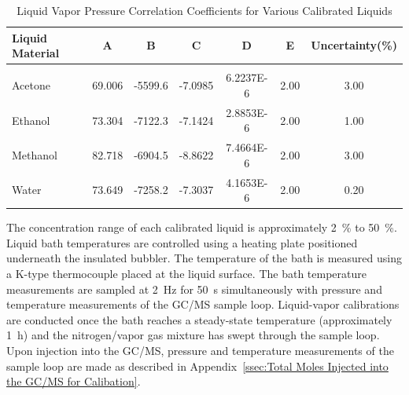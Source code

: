 \documentclass[12pt]{article}
\begin{document}
\begin{table}[!]
\caption{Liquid Vapor Pressure Correlation Coefficients for Various Calibrated Liquids}
\label{tab:Liquid Calibrate_Table}
\centering
	\footnotesize
	\begin{tabular}{lcccccc}
			\hline
\textbf{Liquid Material} &\textbf{A}& \textbf{B}& \textbf{C}&\textbf{D}&\textbf{E}&\textbf{Uncertainty(\%)}\\
\hline
\\[0.001cm]
Acetone	&	69.006	&	-5599.6	&	-7.0985	&	6.2237E-6	& 	2.00	&  3.00\\
Ethanol	&	73.304	&	-7122.3	&	-7.1424	&	2.8853E-6	& 	2.00	&  1.00\\
Methanol	&	82.718	&	-6904.5	&	-8.8622	&	7.4664E-6	& 	2.00	&  3.00\\
Water		&	73.649	&	-7258.2	&	-7.3037	&	4.1653E-6	& 	2.00	&  0.20\\
\hline
\end{tabular}
\end{table}

The concentration range of each calibrated liquid is approximately 2~\% to 50~\%. Liquid bath temperatures are controlled using a heating plate positioned underneath the insulated bubbler. The temperature of the bath is measured using a K-type thermocouple placed at the liquid surface. The bath temperature measurements are sampled at \SI{2}{\hertz} for \SI{50}{s} simultaneously with pressure and temperature measurements of the GC/MS sample loop. Liquid-vapor calibrations are conducted once the bath reaches a steady-state temperature (approximately 1~h) and the nitrogen/vapor gas mixture has swept through the sample loop. Upon injection into the GC/MS, pressure and temperature measurements of the sample loop are made as described in Appendix~\ref{ssec:Total Moles Injected into the GC/MS for Calibation}.
\end{document}
